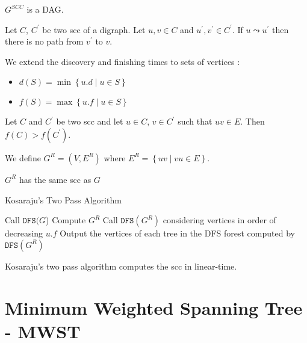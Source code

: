 \documentclass{cours}
\begin{document}
\begin{proposition}
    $G^{SCC}$ is a DAG.
\end{proposition}

\begin{lemma}
    Let $C$, $C^{'}$ be two scc of a digraph. Let $u, v \in C$ and $u^{'}, v^{'} \in C^{'}$. If $u \leadsto u^{'}$ then there is no path from $v^{'}$ to $v$.
\end{lemma}

\begin{definition}
    We extend the discovery and finishing times to sets of vertices :
    \begin{itemize}
        \item $d(S) = \min \left\{u.d \mid u \in S\right\}$
        \item $f(S) = \max \left\{u.f \mid u \in S \right\}$
    \end{itemize}
\end{definition}

\begin{lemma}
    Let $C$ and $C^{'}$ be two scc and let $u \in C$, $v \in C^{'}$ such that $uv \in E$. Then $f(C) > f(C^{'})$.
\end{lemma}

\begin{definition}
    We define $G^{R} = \left(V, E^{R}\right)$ where $E^{R} = \left\{uv \mid vu \in E\right\}$.
\end{definition}

\begin{proposition}
    $G^{R}$ has the same scc as $G$
\end{proposition}

\begin{algorithm}
    \caption{Kosaraju's Two Pass Algorithm}
    \begin{algorithmic}
        \State Call $\texttt{DFS}(G$)
            \State Compute $G^{R}$
            \State Call $\texttt{DFS}(G^{R})$ considering vertices in order of decreasing $u.f$
            \Return Output the vertices of each tree in the DFS forest computed by $\texttt{DFS}(G^{R})$
    \end{algorithmic}
\end{algorithm}

\begin{theorem}
    Kosaraju's two pass algorithm computes the scc in linear-time.
\end{theorem}


\section{Minimum Weighted Spanning Tree - MWST}
\end{document}
